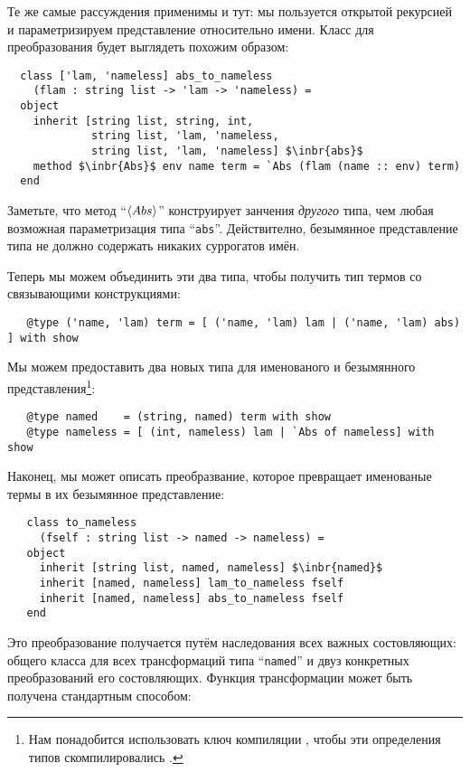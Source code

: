 Те же самые рассуждения применимы и тут: мы пользуется открытой рекурсией и параметризируем представление относительно имени.
Класс для преобразования будет выглядеть похожим образом:

\begin{lstlisting}
  class ['lam, 'nameless] abs_to_nameless
    (flam : string list -> 'lam -> 'nameless) =
  object
    inherit [string list, string, int,
             string list, 'lam, 'nameless,
             string list, 'lam, 'nameless] $\inbr{abs}$
    method $\inbr{Abs}$ env name term = `Abs (flam (name :: env) term)
  end
\end{lstlisting}

Заметьте, что метод ``$\left<Abs\right>$'' конструирует занчения \emph{другого} типа, чем любая возможная параметризация типа ``\lstinline{abs}''. Действително, безымянное представление типа не должно содержать никаких суррогатов имён.

Теперь мы можем объединить эти два типа, чтобы получить тип термов со связывающими конструкциями:

\begin{lstlisting}
   @type ('name, 'lam) term = [ ('name, 'lam) lam | ('name, 'lam) abs) ] with show
\end{lstlisting}

Мы можем предоставить два новых типа для именованого и безымянного представления\footnote{Нам понадобится использовать ключ компиляции
, чтобы эти определения типов скомпилировались .}:

\begin{lstlisting}
   @type named    = (string, named) term with show
   @type nameless = [ (int, nameless) lam | `Abs of nameless] with show
\end{lstlisting}

Наконец, мы может описать преобразвание, которое превращает именованые термы в их безымянное представление:

\begin{lstlisting}
   class to_nameless
     (fself : string list -> named -> nameless) =
   object
     inherit [string list, named, nameless] $\inbr{named}$
     inherit [named, nameless] lam_to_nameless fself
     inherit [named, nameless] abs_to_nameless fself
   end
\end{lstlisting}

Это преобразование получается путём наследования всех важных состовляющих: общего класса для всех трансформаций типа ``\lstinline{named}'' 
и двуз конкретных преобразований его состовляющих. Функция трансформации может быть получена стандартным способом:

